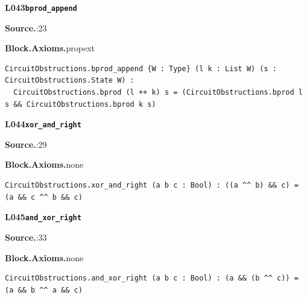 \par\medskip\noindent\begin{minipage}{\textwidth}
{\small\bfseries L043\enspace\texttt{bprod\_append}\par}
{\footnotesize\raggedright\textbf{Source.}\enspace{}:23\par
\textbf{Block.}\quad\textbf{Axioms.}\enspace propext\par}\nopagebreak
\begin{lstlisting}
CircuitObstructions.bprod_append {W : Type} (l k : List W) (s : CircuitObstructions.State W) :
  CircuitObstructions.bprod (l ++ k) s = (CircuitObstructions.bprod l s && CircuitObstructions.bprod k s)
\end{lstlisting}
\end{minipage}\par

\par\medskip\noindent\begin{minipage}{\textwidth}
{\small\bfseries L044\enspace\texttt{xor\_and\_right}\par}
{\footnotesize\raggedright\textbf{Source.}\enspace{}:29\par
\textbf{Block.}\quad\textbf{Axioms.}\enspace none\par}\nopagebreak
\begin{lstlisting}
CircuitObstructions.xor_and_right (a b c : Bool) : ((a ^^ b) && c) = (a && c ^^ b && c)
\end{lstlisting}
\end{minipage}\par

\par\medskip\noindent\begin{minipage}{\textwidth}
{\small\bfseries L045\enspace\texttt{and\_xor\_right}\par}
{\footnotesize\raggedright\textbf{Source.}\enspace{}:33\par
\textbf{Block.}\quad\textbf{Axioms.}\enspace none\par}\nopagebreak
\begin{lstlisting}
CircuitObstructions.and_xor_right (a b c : Bool) : (a && (b ^^ c)) = (a && b ^^ a && c)
\end{lstlisting}
\end{minipage}\par

